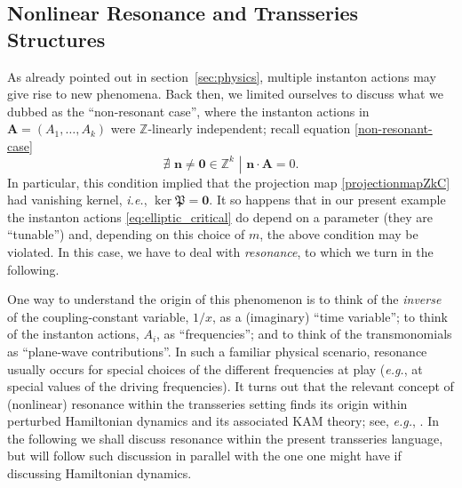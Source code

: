 \documentclass[11pt,a4paper]{article}
\def\BZ{{\mathbb Z}}
\newcommand{\be}{\begin{equation}}
\newcommand{\ee}{\end{equation}}
\begin{document}
\subsection{Nonlinear Resonance and Transseries Structures}\label{sec:nonlinear-resonance}

As already pointed out in section~\ref{sec:physics}, multiple instanton actions may give rise to new phenomena. Back then, we limited ourselves to discuss what we dubbed as the ``non-resonant case'', where the instanton actions in $\boldsymbol{A} = \left( A_1, \ldots, A_k \right)$ were $\BZ$-linearly independent; recall equation \eqref{non-resonant-case}
%
\be
\left. \nexists \,\, \boldsymbol{n} \neq \boldsymbol{0} \in \BZ^k \,\, \right| \,\, \boldsymbol{n} \cdot \boldsymbol{A} = 0.
\ee
%
\noindent
In particular, this condition implied that the projection map \eqref{projectionmapZkC} had vanishing kernel, \textit{i.e.}, $\ker \mathfrak{P} = \boldsymbol{0}$. It so happens that in our present example the instanton actions \eqref{eq:elliptic_critical} do depend on a parameter (they are ``tunable'') and, depending on this choice of $m$, the above condition may be violated. In this case, we have to deal with \textit{resonance}, to which we turn in the following.

One way to understand the origin of this phenomenon is to think of the \textit{inverse} of the coupling-constant variable, $1/x$, as a (imaginary) ``time variable''; to think of the instanton actions, $A_i$, as ``frequencies''; and to think of the transmonomials as ``plane-wave contributions''. In such a familiar physical scenario, resonance usually occurs for special choices of the different frequencies at play (\textit{e.g.}, at special values of the driving frequencies). It turns out that the relevant concept of (nonlinear) resonance within the transseries setting finds its origin within perturbed Hamiltonian dynamics and its associated KAM theory; see, \textit{e.g.}, \cite{gh83, p09}. In the following we shall discuss resonance within the present transseries language, but will follow such discussion in parallel with the one one might have if discussing Hamiltonian dynamics.
\end{document}
